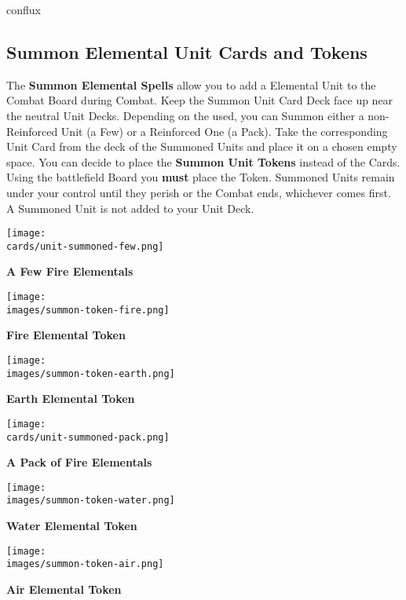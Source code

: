 \vspace*{1em}
\begin{expansion}{conflux}
    \begin{multicols}{2}
    \subsection*{Summon Elemental Unit Cards and Tokens}
    The \textbf{Summon Elemental Spells} allow you to add a Elemental Unit to the Combat Board during Combat.
    Keep the Summon Unit Card Deck face up near the neutral Unit Decks.
    Depending on the  used, you can Summon either a non-Reinforced Unit (a Few) or a Reinforced One (a Pack).
    Take the corresponding Unit Card from the deck of the Summoned Units and place it on a chosen empty space.
    You can decide to place the \textbf{Summon Unit Tokens} instead of the Cards.
    Using the battlefield Board you \textbf{must} place the Token.
    Summoned Units remain under your control until they perish or the Combat ends, whichever comes first.
    A Summoned Unit is not added to your Unit Deck.
    \columnbreak
        \begin{multicols}{2}
        \centering
        \texttt{[image: \\cards/unit-summoned-few.png]}\par
        \textbf{\scriptsize\color{darkcandyapplered}A Few Fire Elementals}\par
        \smallskip
        \texttt{[image: \\images/summon-token-fire.png]}\par
        \centering\textbf{\scriptsize\color{darkcandyapplered}Fire Elemental Token}\par
        \smallskip
        \texttt{[image: \\images/summon-token-earth.png]}\par
        \centering\textbf{\scriptsize\color{darkcandyapplered}Earth Elemental Token}\par

        \columnbreak
        \texttt{[image: \\cards/unit-summoned-pack.png]}\par
        \textbf{\scriptsize\color{darkcandyapplered}A Pack of Fire Elementals\\}\par
        \smallskip
        \texttt{[image: \\images/summon-token-water.png]}\par
        \centering\textbf{\scriptsize\color{darkcandyapplered}Water Elemental Token\\}\par
        \smallskip
        \texttt{[image: \\images/summon-token-air.png]}\par
        \centering\textbf{\scriptsize\color{darkcandyapplered}Air Elemental Token}\par
        \end{multicols}
    \end{multicols}
\end{expansion}

